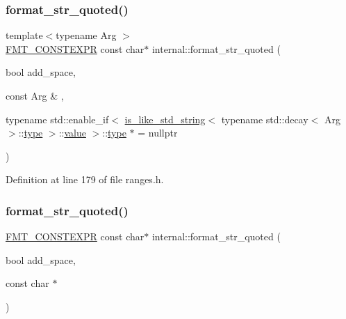 \subsubsection{\texorpdfstring{format\+\_\+str\+\_\+quoted()}{format\_str\_quoted()}\hspace{0.1cm}{\footnotesize\ttfamily [2/6]}}
{\footnotesize\ttfamily template$<$typename Arg $>$ \\
\hyperlink{core_8h_a69201cb276383873487bf68b4ef8b4cd}{F\+M\+T\+\_\+\+C\+O\+N\+S\+T\+E\+X\+PR} const char$\ast$ internal\+::format\+\_\+str\+\_\+quoted (\begin{DoxyParamCaption}\item[{bool}]{add\+\_\+space,  }\item[{const Arg \&}]{,  }\item[{typename std\+::enable\+\_\+if$<$ \hyperlink{classinternal_1_1is__like__std__string}{is\+\_\+like\+\_\+std\+\_\+string}$<$ typename std\+::decay$<$ Arg $>$\+::\hyperlink{namespaceinternal_a8661864098ac0acff9a6dd7e66f59038}{type} $>$\+::\hyperlink{classinternal_1_1value}{value} $>$\+::\hyperlink{namespaceinternal_a8661864098ac0acff9a6dd7e66f59038}{type} $\ast$}]{ = {\ttfamily nullptr} }\end{DoxyParamCaption})}



Definition at line 179 of file ranges.\+h.

\mbox{\label{namespaceinternal_aa20fe9d203b6585b35f99cf2b5de3609}} 
\subsubsection{\texorpdfstring{format\+\_\+str\+\_\+quoted()}{format\_str\_quoted()}\hspace{0.1cm}{\footnotesize\ttfamily [3/6]}}
{\footnotesize\ttfamily \hyperlink{core_8h_a69201cb276383873487bf68b4ef8b4cd}{F\+M\+T\+\_\+\+C\+O\+N\+S\+T\+E\+X\+PR} const char$\ast$ internal\+::format\+\_\+str\+\_\+quoted (\begin{DoxyParamCaption}\item[{bool}]{add\+\_\+space,  }\item[{const char $\ast$}]{ }\end{DoxyParamCaption})}



